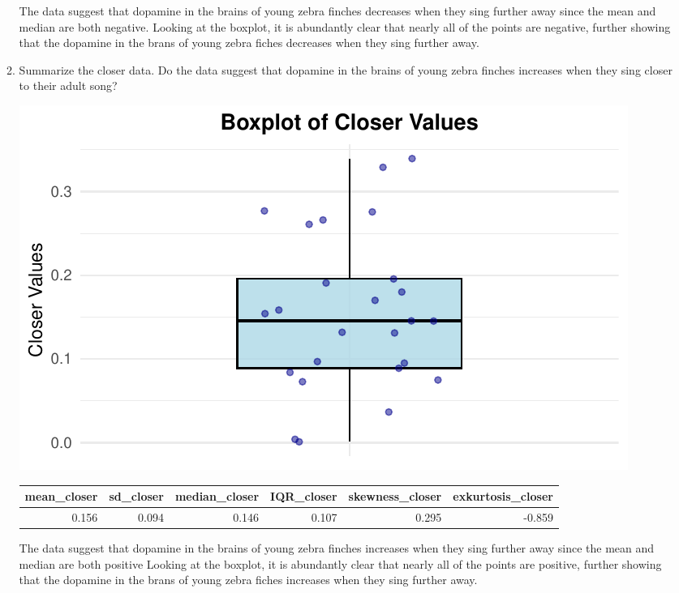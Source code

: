 \documentclass{article}\usepackage[]{graphicx}\usepackage[]{xcolor}
\makeatletter
\def\maxwidth{ %
  \ifdim\Gin@nat@width>\linewidth
    \linewidth
  \else
    \Gin@nat@width
  \fi
}
\newenvironment{knitrout}{}{} %
\makeatother
\begin{document}
\begin{enumerate}
\begin{enumerate}
The data suggest that dopamine in the brains of young zebra finches decreases when they sing further away
since the mean and median are both negative. Looking at the boxplot, it is abundantly clear
that nearly all of the points are negative, further showing that the dopamine in the brans of young zebra
fiches decreases when they sing further away.


   \item Summarize the closer data. Do the data suggest that
   dopamine in the brains of young zebra finches increases when
   they sing closer to their adult song?
\begin{knitrout}
\color{fgcolor}

{\centering \includegraphics[width=\maxwidth]{figure/unnamed-chunk-5-1} 

}


\end{knitrout}
\begin{table}[ht]
\centering
\begin{tabular}{rrrrrr}
  \hline
mean\_closer & sd\_closer & median\_closer & IQR\_closer & skewness\_closer & exkurtosis\_closer \\ 
  \hline
0.156 & 0.094 & 0.146 & 0.107 & 0.295 & -0.859 \\ 
   \hline
\end{tabular}
\end{table}

The data suggest that dopamine in the brains of young zebra finches increases when they sing further away
since the mean and median are both positive Looking at the boxplot, it is abundantly clear
that nearly all of the points are positive, further showing that the dopamine in the brans of young zebra
fiches increases when they sing further away.



\end{enumerate}
\end{enumerate}
\end{document}
